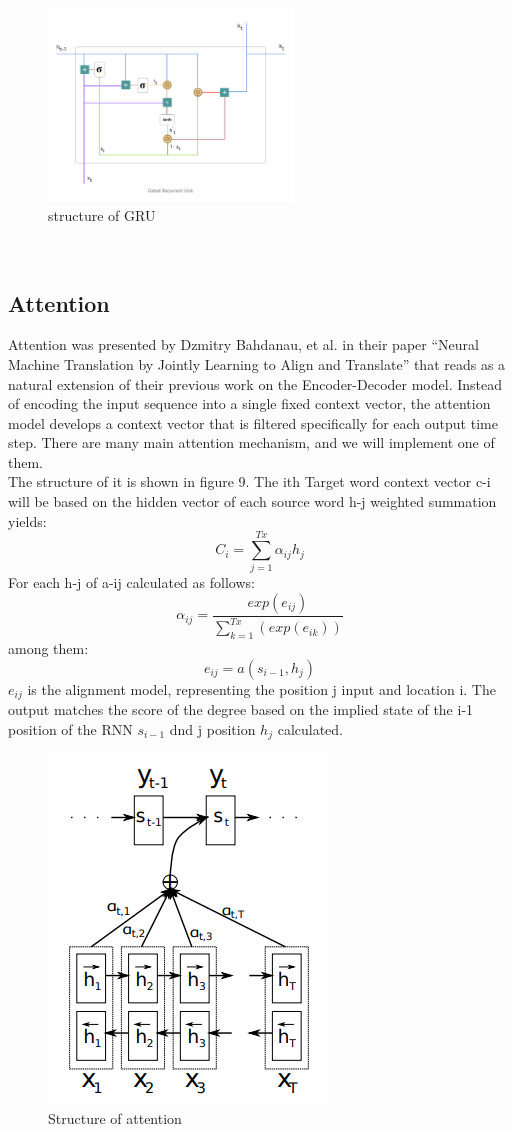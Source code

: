 \documentclass{article}
\begin{document}
\begin{figure}[htb]
\centering
\includegraphics[width=6.5cm]{GRU.png}
\caption{structure of GRU}
\end{figure}\\


\subsection{Attention}
Attention was presented by Dzmitry Bahdanau, et al. in their paper “Neural Machine Translation by Jointly Learning to Align and Translate” that reads as a natural extension of their previous work on the Encoder-Decoder model. Instead of encoding the input sequence into a single fixed context vector, the attention model develops a context vector that is filtered specifically for each output time step. There are many main attention mechanism, and we will implement one of them.\\[2]
The structure of it is shown in figure 9. The ith Target word context vector c-i will be based on the hidden vector of each source word h-j weighted summation yields: $$C_i=\sum_{j=1}^{Tx}\alpha_{ij}h_{j}$$
For each h-j of a-ij calculated as follows:
$$\alpha_{ij} = \frac{exp(e_{ij})}{\sum_{k=1}^{Tx}(exp(e_{ik}))}$$
among them:
$$e_{ij} = a(s_{i-1},h_j)$$
$e_{ij}$ is the alignment model, representing the position j input and location i. The output matches the score of the degree based on the implied state of the i-1 position of the RNN $s_{i-1}$ dnd j position $h_{j}$ calculated.
\begin{figure}[htbp]
\centering
\includegraphics[scale=0.35]{bahda.png}
\caption{Structure of attention}
\end{figure}
\end{document}
